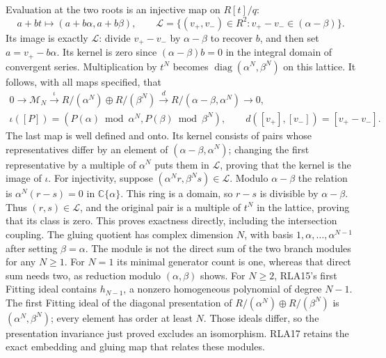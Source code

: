 Evaluation at the two roots is an injective map on $R[t]/q$:
\[
 a+bt\longmapsto(a+b\alpha,a+b\beta),\qquad
 \mathcal L=\{(v_+,v_-)\in R^2:
                      v_+-v_-\in(\alpha-\beta)\}.
 \tag{RLA16}
\]
Its image is exactly $\mathcal L$: divide $v_+-v_-$ by
$\alpha-\beta$ to recover $b$, and then set $a=v_+-b\alpha$.
Its kernel is zero since $(\alpha-\beta)b=0$ in the integral
domain of convergent series.  Multiplication by $t^N$ becomes
$\operatorname{diag}(\alpha^N,\beta^N)$ on this lattice.
It follows, with all maps specified, that
\[
\begin{gathered}
 0\longrightarrow\mathcal M_N
 \xrightarrow{\,\iota\,}R/(\alpha^N)\oplus R/(\beta^N)
 \xrightarrow{\,d\,}R/(\alpha-\beta,\alpha^N)
 \longrightarrow0,\\
 \iota([P])=(P(\alpha)\bmod\alpha^N,
                         P(\beta)\bmod\beta^N),\qquad
 d([v_+],[v_-])=[v_+-v_-].
\end{gathered}\tag{RLA17}
\]
The last map is well defined and onto.  Its kernel consists of
pairs whose representatives differ by an element of
$(\alpha-\beta,\alpha^N)$; changing the first representative by
a multiple of $\alpha^N$ puts them in $\mathcal L$, proving that
the kernel is the image of $\iota$.
For injectivity, suppose $(\alpha^Nr,\beta^Ns)\in\mathcal L$.
Modulo $\alpha-\beta$ the relation is
$\alpha^N(r-s)=0$ in $\mathbb C\{\alpha\}$.
This ring is a domain, so $r-s$ is divisible by $\alpha-\beta$.
Thus $(r,s)\in\mathcal L$, and the original pair is a multiple of
$t^N$ in the lattice, proving that its class is zero.
This proves exactness directly, including the intersection coupling.
The gluing quotient has complex dimension $N$, with basis
$1,\alpha,\ldots,\alpha^{N-1}$ after setting $\beta=\alpha$.
The module is not the direct sum of the two branch modules for
any $N\ge1$.  For $N=1$ its minimal generator count is one,
whereas that direct sum needs two, as reduction modulo
$(\alpha,\beta)$ shows.  For $N\ge2$, RLA15's first Fitting
ideal contains $h_{N-1}$, a nonzero homogeneous polynomial of
degree $N-1$.  The first Fitting ideal of the diagonal
presentation of $R/(\alpha^N)\oplus R/(\beta^N)$ is
$(\alpha^N,\beta^N)$; every element has order at least $N$.
Those ideals differ, so the presentation invariance just proved
excludes an isomorphism.  RLA17 retains the exact embedding and
gluing map that relates these modules.

